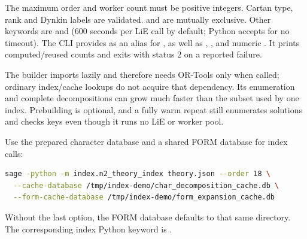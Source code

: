The maximum order and worker count must be positive integers. Cartan type,
rank and Dynkin labels are validated.  and
 are mutually exclusive. Other keywords are
 and  (600 seconds per LiE call by default;
Python accepts  for no timeout). The CLI provides
 as an alias for , as well as
, , and numeric .
It prints computed/reused counts and exits with status 2 on a reported failure.

The builder imports  lazily and therefore needs OR-Tools
only when called; ordinary index/cache lookups do not acquire that dependency.
Its enumeration and complete decompositions can grow much faster than the subset
used by one index. Prebuilding is optional, and a fully warm repeat still
enumerates solutions and checks keys even though it runs no LiE or worker pool.

Use the prepared character database and a shared FORM database for index calls:
\begin{lstlisting}[language=bash]
sage -python -m index.n2_theory_index theory.json --order 18 \
  --cache-database /tmp/index-demo/char_decomposition_cache.db \
  --form-cache-database /tmp/index-demo/form_expansion_cache.db
\end{lstlisting}
Without the last option, the FORM database defaults to that same directory.
The corresponding index Python keyword is .
